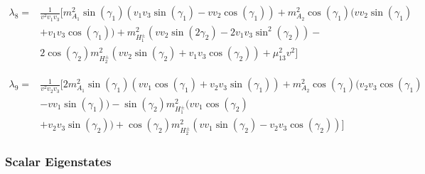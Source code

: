 \documentclass[10pt]{report}
\begin{document}
\begin{equation}
\begin{split} 
\lambda_8 = & \frac{1}{v^2v_1v_3} \Bigg[ m_{A_1}^2 \sin \left(\gamma_1\right) \left(v_1 v_3 \sin \left(\gamma_1\right)-vv_2 \cos \left(\gamma_1\right)\right)  + m_{A_2}^2 \cos \left(\gamma_1\right) \Big(vv_2 \sin \left(\gamma_1\right) \\ & +v_1v_3 \cos \left(\gamma_1\right)\Big)  + m_{H_1^\pm}^2 \left(vv_2 \sin \left(2 \gamma_2\right)-2v_1v_3 \sin ^2\left(\gamma_2\right)\right) -\\ & 2 \cos \left(\gamma_2\right) m_{H_2^\pm}^2 \left(vv_2 \sin \left(\gamma_2\right) +v_1v_3 \cos \left(\gamma_2\right)\right)+\mu_{13}^2 v^2 \Bigg] 
\end{split} 
\end{equation}

\begin{equation}
\begin{split} 
\lambda_9 = & \frac{1}{v^2v_2v_3} \Bigg[ 2 m_{A_1}^2 \sin \left(\gamma_1\right) \left(v v_1 \cos \left(\gamma_1\right)+ v_2 v_3 \sin \left(\gamma_1\right)\right)  +m_{A_2}^2 \cos \left(\gamma_1\right) \Bigg(v_2 v_3 \cos \left(\gamma_1\right) \\ & -v v_1 \sin \left(\gamma_1\right)\Bigg)  -\sin \left(\gamma_2\right) m_{H_1^\pm}^2 \Big(vv_1 \cos \left(\gamma_2\right) \\ & +v_2 v_3 \sin \left(\gamma_2\right)\Big)+\cos \left(\gamma_2\right) m_{H_2^\pm}^2 \left(v v_1 \sin \left(\gamma_2\right)  -v_2 v_3 \cos \left(\gamma_2\right)\right) \Bigg] 
\end{split} 
\end{equation}

\subsubsection{Scalar Eigenstates}
\end{document}
